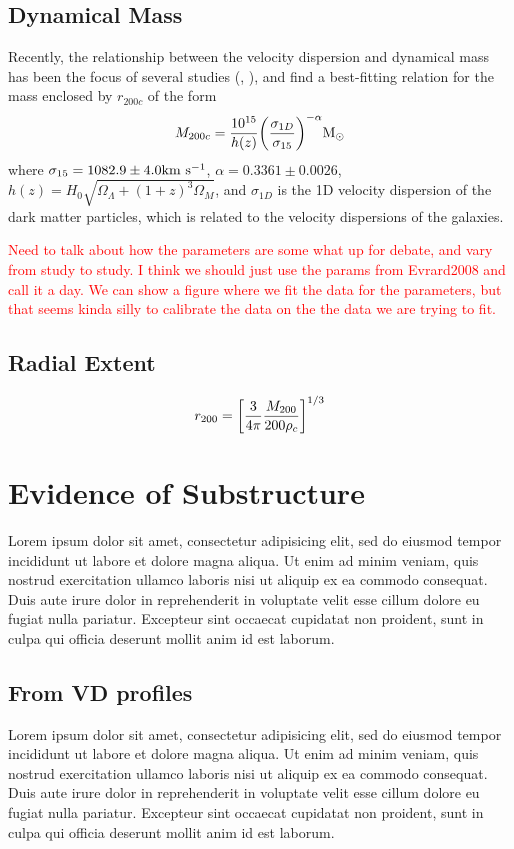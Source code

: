 \documentclass[apj, revtex4]{emulateapj}
\newcommand{\editorial}[1]{\textcolor{red}{#1} }
\begin{document}
\subsection{Dynamical Mass}
Recently, the relationship between the velocity dispersion and dynamical mass has been the focus of several studies (\eg, \citealt{Evrard2008, Saro2013, Sifon2013, VanderBurg2014}), and find a best-fitting relation for the mass enclosed by $r_{200c}$ of the form
\begin{equation}
	M_{200c} = \frac{10^{15}}{h(z)} \bigg{(}\frac{\sigma_{1D}}{\sigma_{15}} \bigg{)}^{-\alpha} \hbox{$\mathrm{M}_\odot$}
\end{equation}
where $\sigma_{15} = 1082.9 \pm 4.0 \hbox{km~s$^{-1}$}$, $\alpha = 0.3361 \pm 0.0026$, $h(z) = H_0 \sqrt{\Omega_\Lambda + (1+z)^3\Omega_M}$, and $\sigma_{1D}$ is the 1D velocity dispersion of the dark matter particles, which is related to the velocity dispersions of the galaxies. 

\editorial{Need to talk about how the parameters are some what up for debate, and vary from study to study. I think we should just use the params from Evrard2008 and call it a day. We can show a figure where we fit the data for the parameters, but that seems kinda silly to calibrate the data on the the data we are trying to fit.}

\subsection{Radial Extent}
\begin{equation}
	r_{200} = \bigg{[} \frac{3}{4\pi} \frac{M_{200}}{200\rho_c} \bigg{]}^{1/3}
\end{equation}

\section{Evidence of Substructure}
Lorem ipsum dolor sit amet, consectetur adipisicing elit, sed do eiusmod tempor incididunt ut labore et dolore magna aliqua. Ut enim ad minim veniam, quis nostrud exercitation ullamco laboris nisi ut aliquip ex ea commodo consequat. Duis aute irure dolor in reprehenderit in voluptate velit esse cillum dolore eu fugiat nulla pariatur. Excepteur sint occaecat cupidatat non proident, sunt in culpa qui officia deserunt mollit anim id est laborum.
\subsection{From VD profiles}
Lorem ipsum dolor sit amet, consectetur adipisicing elit, sed do eiusmod tempor incididunt ut labore et dolore magna aliqua. Ut enim ad minim veniam, quis nostrud exercitation ullamco laboris nisi ut aliquip ex ea commodo consequat. Duis aute irure dolor in reprehenderit in voluptate velit esse cillum dolore eu fugiat nulla pariatur. Excepteur sint occaecat cupidatat non proident, sunt in culpa qui officia deserunt mollit anim id est laborum.
\end{document}

